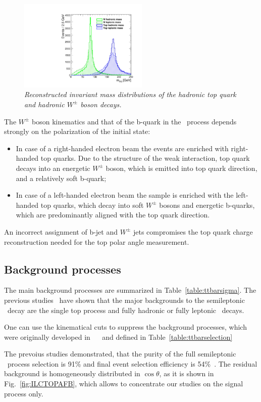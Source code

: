 \begin{figure}[h]
	{\centering
		\includegraphics[width=0.55\textwidth]{ILD/plots/top-w-mass-new.pdf}
		\caption{\sl Reconstructed invariant mass distributions of the hadronic top quark and hadronic $W^\pm$ boson decays.
		}
		\label{fig:TopWmass_3}
	}
	
\end{figure}

The $W^\pm$ boson kinematics and that of the b-quark in the \ttbar\ process depends strongly on the polarization of the initial state:
\begin{itemize}
	\item In case of a right-handed electron beam the events are enriched with right-handed top quarks. Due to the structure of the weak interaction, top quark decays into an energetic $W^\pm$ boson, which is emitted into top quark direction, and a relatively soft b-quark;
	\item In case of a left-handed electron beam the sample is enriched with the left-handed top quarks, which decay into soft $W^\pm$ bosons and energetic b-quarks, which are predominantly aligned with the top quark direction. 
\end{itemize}
An incorrect assignment of b-jet and $W^\pm$ jets compromises the top quark charge reconstruction needed for the top polar angle measurement. 

\subsection{Background processes}\label{sec:TopBkg}
The main background processes are summarized in Table~\ref{table:ttbarsigma}. 
The previous studies~\cite{bib:ILCTOP}\cite{bib:Doublet} have shown that the major backgrounds to the semileptonic \ttbar\ decay are the single top process and fully hadronic or fully leptonic \ttbar\ decays. 


One can use the kinematical cuts to suppress the background processes, which were originally developed in ~\cite{bib:Doublet}~\cite{bib:Jeremy} and defined in Table~\ref{table:ttbarselection}

The prevoius studies demonstrated, that the purity of the full semileptonic \ttbar\ process selection is 91\% and final event selection efficiency is 54\%~\cite{bib:ILCTOP}.
The residual background is homogeneously distributed in $\cos\theta$, as it is shown in Fig.~\ref{fig:ILCTOPAFB}, which allows to concentrate our studies on the signal process only. 

